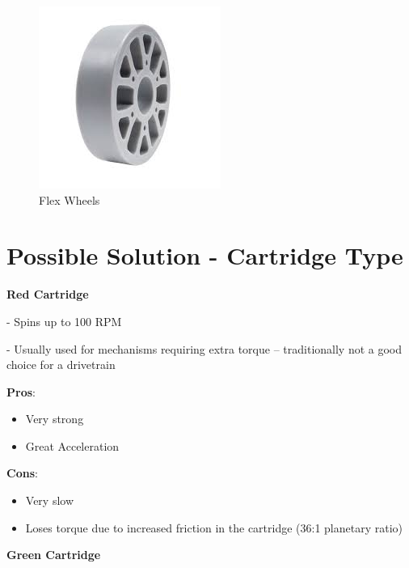 \begin{figure}[hbt!]
\begin{minipage}{.5\textwidth}
        \label{fig:traction-wheels}
    \end{minipage}
    \begin{minipage}{.5\textwidth}
        \centering
        \includegraphics[width=.8\linewidth]{images/Flex Wheels.jpg}
        \caption{Flex Wheels}
        \label{fig:flex-wheels}
    \end{minipage}%
\end{figure}
\pagebreak
\section*{Possible Solution - Cartridge Type}
\noindent 
\textbf{Red Cartridge}

- Spins up to 100 RPM

- Usually used for mechanisms requiring extra torque -- traditionally not a good choice for a drivetrain

\noindent
\textbf{Pros}:
\begin{itemize}
    \item Very strong
    \item Great Acceleration
\end{itemize}
\textbf{Cons}:
\begin{itemize}
    \item Very slow 
    \item Loses torque due to increased friction in the cartridge (36:1 planetary ratio)
\end{itemize}

\noindent 
\textbf{Green Cartridge}

